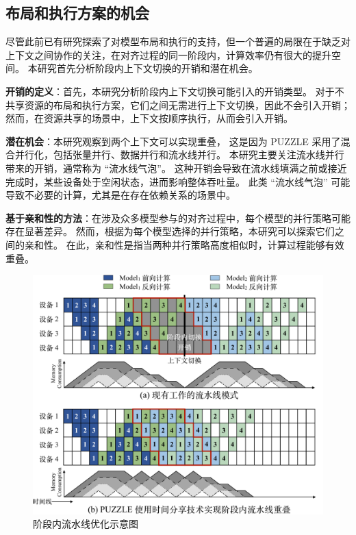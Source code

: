 \subsection{布局和执行方案的机会}
尽管此前已有研究探索了对模型布局和执行的支持，但一个普遍的局限在于缺乏对上下文之间协作的关注，在对齐过程的同一阶段内，计算效率仍有很大的提升空间。
本研究首先分析阶段内上下文切换的开销和潜在机会。 

\textbf{开销的定义}：首先，本研究分析阶段内上下文切换可能引入的开销类型。
对于不共享资源的布局和执行方案，它们之间无需进行上下文切换，因此不会引入开销；然而，在资源共享的场景中，上下文按顺序执行，从而会引入开销。 

\textbf{潜在机会}：本研究观察到两个上下文可以实现重叠，
这是因为 PUZZLE 采用了混合并行化，包括张量并行、数据并行和流水线并行。
本研究主要关注流水线并行带来的开销，通常称为 “流水线气泡”。
这种开销会导致在流水线填满之前或接近完成时，某些设备处于空闲状态，进而影响整体吞吐量。
此类 “流水线气泡” 可能导致不必要的计算，尤其是在存在依赖关系的场景中。 

\textbf{基于亲和性的方法}：在涉及众多模型参与的对齐过程中，每个模型的并行策略可能存在显著差异。
然而，根据为每个模型选择的并行策略，本研究可以探索它们之间的亲和性。
在此，亲和性是指当两种并行策略高度相似时，计算过程能够有效重叠。 


\begin{figure}[ht]
    \centering
    \includegraphics[width=0.8\linewidth]{figures/puzzle/4-intra-stage-context-switch-crop.pdf}
    \caption{阶段内流水线优化示意图
    }
    \label{fig:overlapping_example}
\end{figure}

